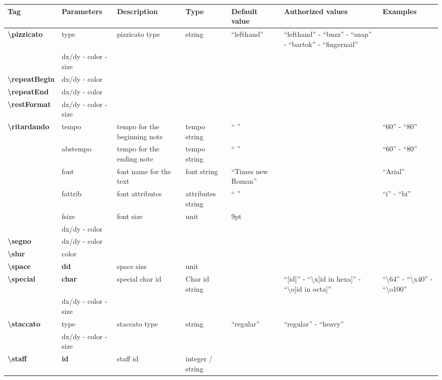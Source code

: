 \documentclass[a4paper, landscape, 10pt]{article}
\begin{document}
\begin{tabularx}{\linewidth}{p{3cm}p{3cm}p{5cm}p{3cm}p{2.5cm}p{3.5cm}p{4cm}}
    \hline
    \textbf{Tag}&\textbf{Parameters}&\textbf{Description}&\textbf{Type}&\textbf{Default value}&\textbf{Authorized values}&\textbf{Examples}\\
    \hline
    \textbf{\textbackslash{}pizzicato}&type&pizzicato type&string&``lefthand''&``lefthand'' - ``buzz'' - ``snap'' - ``bartok'' - ``fingernail''&\\
        &dx/dy - color - size&&&&&\\
    \hline
    \textbf{\textbackslash{}repeatBegin}&dx/dy - color&&&&&\\
    \hline
    \textbf{\textbackslash{}repeatEnd}&dx/dy - color&&&&&\\
    \hline
    \textbf{\textbackslash{}restFormat}&dx/dy - color - size&&&&&\\
    \hline
    \textbf{\textbackslash{}ritardando}&tempo&tempo for the beginning note&tempo string&`` ''&&``60'' - ``80''\\
    &abstempo&tempo for the ending note&tempo string&`` ''&&``60'' - ``80''\\
    &font&font name for the text&font string&``Times new Roman''&&``Arial''\\
    &fattrib&font attributes&attributes string&`` ''&&``i'' - ``bi''\\
    &fsize&font size&unit&9pt&&\\
    &dx/dy - color&&&&&\\
    \hline
	\textbf{\textbackslash{}segno}&dx/dy - color&&&&&\\
    \hline
	\textbf{\textbackslash{}slur}&color&&&&&\\
    \hline
    \textbf{\textbackslash{}space}&\textbf{dd}&space size&unit&&&\\
    \hline
    \textbf{\textbackslash{}special}&\textbf{char}&special char id&Char id string&&``[id]'' - ``\textbackslash{}x[id in hexa]'' - ``\textbackslash{}o[id in octa]''&``\textbackslash{}64'' - ``\textbackslash{}x40'' - ``\textbackslash{}o100''\\
    &dx/dy - color - size&&&&&\\
    \hline
    \textbf{\textbackslash{}staccato}&type&staccato type&string&``regular''&``regular'' - ``heavy''&\\
    &dx/dy - color - size&&&&&\\
    \hline
    \textbf{\textbackslash{}staff}&\textbf{id}&staff id&integer / string&&&\\

\end{tabularx}
\end{document}
